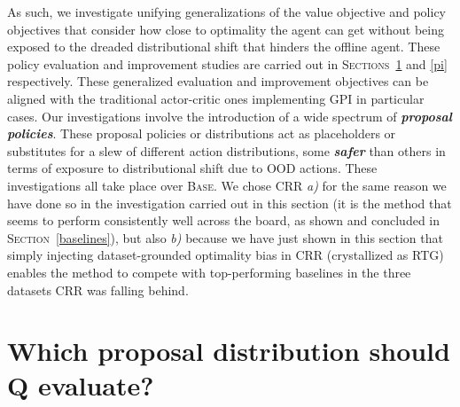 As such, we investigate unifying generalizations of the value objective
and policy objectives that consider how close to optimality the agent can get
without being exposed to the dreaded distributional shift that hinders the offline agent.
These policy evaluation and improvement studies
are carried out in \textsc{Sections}~\ref{pe} and \ref{pi} respectively.
These generalized evaluation and improvement objectives
can be aligned with the traditional actor-critic ones implementing GPI
in particular cases.
Our investigations involve the introduction of a wide spectrum of \textbf{\emph{proposal policies}}.
These proposal policies or distributions
act as placeholders or substitutes for a slew of different action distributions,
some \textbf{\emph{safer}} than others in terms of exposure to distributional shift due to OOD actions.
These investigations all take place
over \textsc{Base}.
We chose CRR
\textit{a)}
for the same reason we have done so in the investigation carried out in this section
(it is the method that seems to perform consistently well across the board,
as shown and concluded in \textsc{Section}~\ref{baselines}),
but also
\textit{b)}
because we have just shown in this section that simply injecting dataset-grounded optimality bias
in CRR (crystallized as RTG) enables the method to compete with top-performing baselines in the
three datasets CRR was falling behind.

\section{Which proposal distribution should Q evaluate?}
\label{pe}


